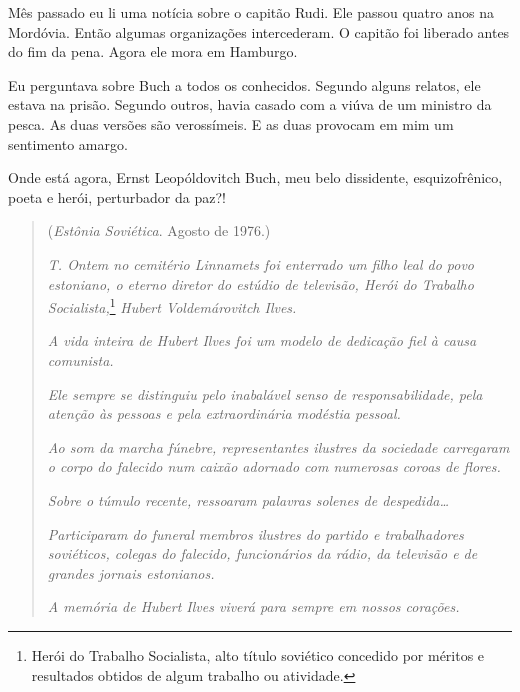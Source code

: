 Mês passado eu li uma notícia sobre o capitão Rudi. Ele passou quatro
anos na Mordóvia. Então algumas organizações intercederam. O
capitão foi liberado antes do fim da pena. Agora ele mora em
Hamburgo.

Eu perguntava sobre Buch a todos os conhecidos. Segundo alguns relatos,
ele estava na prisão. Segundo outros, havia casado com a viúva de um
ministro da pesca. As duas versões são verossímeis. E as duas provocam
em mim um sentimento amargo.

Onde está agora, Ernst Leopóldovitch Buch, meu belo dissidente,
esquizofrênico, poeta e herói, perturbador da paz?!

\clearpage
\thispagestyle{empty}

\movetooddpage
\begin{center}
{}
\end{center}

\begin{quotation}
\begin{flushright}
(\emph{Estônia Soviética}. Agosto de 1976.)
\end{flushright}
\vspace{4pt}
\noindent\emph{T. Ontem no cemitério Linnamets foi
enterrado um filho leal do povo estoniano, o eterno diretor do estúdio
de televisão, Herói do Trabalho Socialista,}\footnote{Herói do Trabalho Socialista, alto
  título soviético concedido por méritos e resultados obti­dos de algum
  trabalho ou atividade.} \emph{Hubert Voldemárovitch Ilves.}

\emph{A vida inteira de Hubert Ilves foi um modelo de dedicação fiel à
causa comunista.}

\emph{Ele sempre se distinguiu pelo inabalável senso de
responsabilidade, pela atenção às pessoas e pela extraordinária modéstia
pessoal.}

\emph{Ao som da marcha fúnebre, representantes ilustres da sociedade
carregaram o corpo do falecido num caixão adornado com numerosas coroas
de flores.}

\emph{Sobre o túmulo recente, ressoaram palavras solenes de
despedida\ldots{}}

\emph{Participaram do funeral membros ilustres do partido e
trabalhadores soviéticos, colegas do falecido, funcionários da rádio, da
televisão e de grandes jornais estonianos.}

\emph{A memória de Hubert Ilves viverá para sempre em nossos corações.}
\end{quotation}

